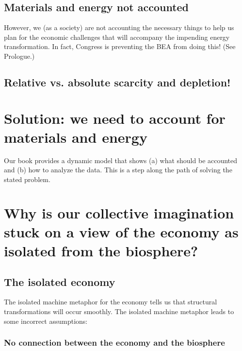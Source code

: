 \subsection{Materials and energy not accounted}
\label{sec:accounting}

However, we (as a society) are not accounting the necessary things to help us plan for the economic challenges that will accompany the impending energy transformation. In fact, Congress is preventing the BEA from doing this! (See Prologue.)


\subsection{Relative vs. absolute scarcity and depletion!}
\label{sec:scarcity}

\section{Solution: we need to account for materials and energy}
\label{sec:solution}

Our book provides a dynamic model that shows (a) what should be accounted and (b) how to analyze the data. This is a step along the path of solving the stated problem.

\section{Why is our collective imagination stuck on a view of the economy as isolated from the biosphere?}
\label{sec:collective_imagination}

\subsection{The isolated economy}
\label{sec:isolated_economy}

The isolated machine metaphor for the economy tells us that structural transformations will occur smoothly. 
     The isolated machine metaphor leads to some incorrect assumptions:

\subsubsection{No connection between the economy and the biosphere}
\label{sec:no_connection}


